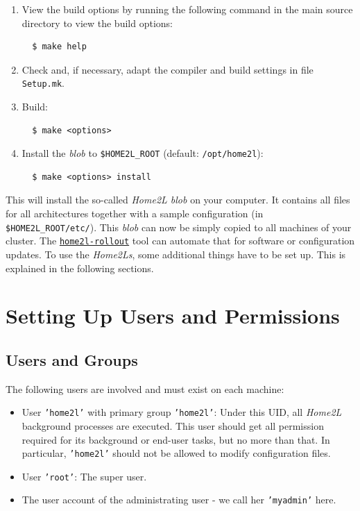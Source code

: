 \documentclass[12pt,english,parskip=half]{scrreprt}
\newcommand{\idx}[1]{#1\index{#1}}
\newcommand{\toolref}[1]{\hyperref[tool:#1]{\texttt{\idx{#1}}}}
\begin{document}
\begin{enumerate}
\item
  View the build options by running the following command in the main
  source directory to view the build options:
  \begin{lstlisting}
  $ make help
  \end{lstlisting}
\item
  Check and, if necessary, adapt the compiler and build settings in file \texttt{Setup.mk}.
\item
  Build:
  \begin{lstlisting}
  $ make <options>
  \end{lstlisting}
\item
  Install the \emph{blob} to \texttt{\$HOME2L\_ROOT} (default:
  \texttt{/opt/home2l}):
  \begin{lstlisting}
  $ make <options> install
  \end{lstlisting}
\end{enumerate}

This will install the so-called \emph{Home2L blob} on your computer. It
contains all files for all architectures together with a sample
configuration (in \texttt{\$HOME2L\_ROOT/etc/}). This \emph{blob} can now be simply
copied to all machines of your cluster. The \toolref{home2l-rollout} tool
can automate that for software or configuration updates.
To use the \emph{Home2Ls}, some additional things have to be set up.
This is explained in the following sections.





\section{Setting Up Users and Permissions}
\label{sec:installing-users}



\subsection{Users and Groups}

The following users are involved and must exist on each machine:

\begin{itemize}
\item
  User \texttt{'home2l'} with primary group \texttt{'home2l'}: Under this
  UID, all \emph{Home2L} background processes are executed. This user should get
  all permission required for its background or end-user tasks, but no more than that.
  In particular, \texttt{'home2l'} should not be allowed to modify configuration files.
\item
  User \texttt{'root'}: The super user.
\item
  The user account of the administrating user - we call her \texttt{'myadmin'} here.
\end{itemize}
\end{document}
